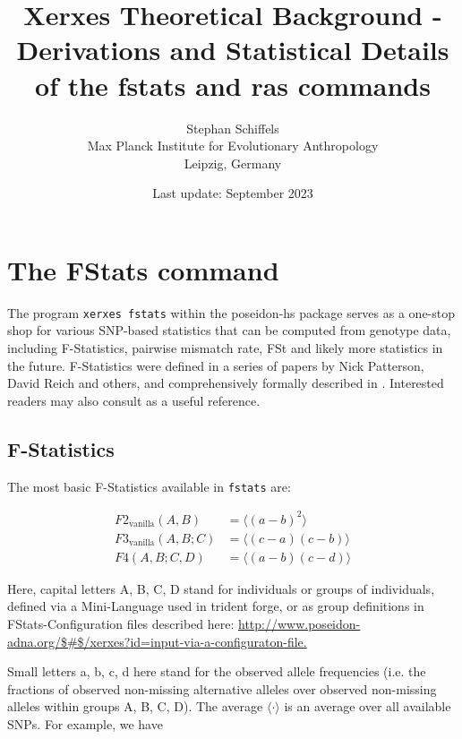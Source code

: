 \documentclass{article}
\begin{document}
\title{Xerxes Theoretical Background - Derivations and Statistical Details of the fstats and ras commands}
\author{Stephan Schiffels\\Max Planck Institute for Evolutionary Anthropology\\ Leipzig, Germany}
\date{Last update: September 2023}
\maketitle

\section{The FStats command}

The program \texttt{xerxes fstats} within the poseidon-hs package serves as a one-stop shop for various SNP-based statistics that can be computed from genotype data, including F-Statistics, pairwise mismatch rate, FSt and likely more statistics in the future. F-Statistics were defined in a series of papers by Nick Patterson, David Reich and others, and comprehensively formally described in \cite{Patterson2012-yq}. Interested readers may also consult \cite{Peter2016-ml} as a useful reference.

\subsection{F-Statistics}

The most basic F-Statistics available in \texttt{fstats} are:

\begin{align}
F2_\text{vanilla}(A, B) &= \langle(a-b)^2\rangle\\
F3_\text{vanilla}(A, B; C) &= \langle (c-a)(c-b) \rangle\\
F4(A, B; C, D) &= \langle (a-b)(c-d) \rangle
\end{align}

Here, capital letters A, B, C, D stand for individuals or groups of individuals, defined via a Mini-Language used in trident forge, or as group definitions in FStats-Configuration files described here: \url{http://www.poseidon-adna.org/$\#$/xerxes?id=input-via-a-configuraton-file.}

Small letters a, b, c, d here stand for the observed allele frequencies (i.e. the fractions of observed non-missing alternative alleles over observed non-missing alleles within groups A, B, C, D). The average \(\langle \cdot\rangle\) is an average over all available SNPs. For example, we have
\end{document}
